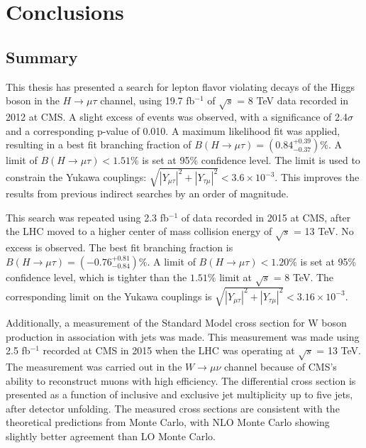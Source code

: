 \documentclass[oneside, letterpaper, oldfontcommands]{memoir}
\begin{document}
\chapter{Conclusions}
\section{Summary}
\qquad This thesis has presented a search for lepton flavor violating decays of the Higgs boson in the $H \rightarrow \mu \tau$ channel, using 19.7 fb$^{-1}$ of $\sqrt{s}$ = 8 TeV data recorded in 2012 at CMS. 
A slight excess of events was observed, with a significance of 2.4$\sigma$ and a corresponding p-value of 0.010. A maximum likelihood fit was applied, 
resulting in a best fit branching fraction of $B(H \rightarrow \mu \tau) = (0.84^{+0.39}_{-0.37})\%$. 
A limit of $B(H\rightarrow \mu\tau) < 1.51\%$ is set at 95\% confidence level. The limit is used to constrain the Yukawa couplings: $\sqrt{|Y_{\mu\tau}|^{2} + |Y_{\tau\mu}|^{2}} < 3.6 \times 10^{-3}$. This improves the results from previous indirect searches by an order of magnitude. 

\qquad This search was repeated using 2.3 fb$^{-1}$ of data recorded in 2015 at CMS, after the LHC moved to a higher center of mass collision energy of $\sqrt{s}$ = 13 TeV. No excess is observed. The best fit branching fraction is $B(H \rightarrow \mu\tau) = (-0.76^{+0.81}_{-0.84})\%$. A limit of $B(H \rightarrow \mu\tau) < 1.20\%$ is set at 95\% confidence level, which is tighter than the $1.51\%$ limit at $\sqrt{s}$ = 8 TeV. The corresponding limit on the Yukawa couplings is $\sqrt{|Y_{\mu\tau}|^{2} + |Y_{\tau\mu}|^{2}} < 3.16 \times 10^{-3}$.

\qquad Additionally, a measurement of the Standard Model cross section for W boson production in association with jets was made. This measurement was made using 2.5 fb$^{-1}$ recorded at CMS in 2015 when the LHC was operating at $\sqrt{s}$ = 13 TeV. The measurement was carried out in the $W \rightarrow \mu \nu$ channel because of CMS's ability to reconstruct muons with high efficiency. The differential cross section is presented as a function of inclusive and exclusive jet multiplicity up to five jets, after detector unfolding. The measured cross sections are consistent with the theoretical predictions from Monte Carlo, with NLO Monte Carlo showing slightly better agreement than LO Monte Carlo.
\end{document}
